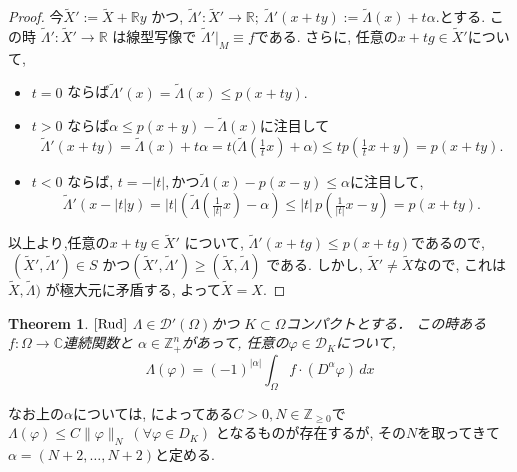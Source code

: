 \documentclass[dvipdfmx,a4paper,11pt]{article} %
\newtheorem{thm}{Theorem}[section]
\theoremstyle{definition}
\theoremstyle{remark}
\numberwithin{equation}{section}
\newcommand{\N}{\mathbb{Z}_+}
\newcommand{\C}{\mathbb{C}}
\begin{document}
\begin{proof}
今\(\widetilde{X}' := \widetilde{X} + \mathbb{R}y\) かつ, 
\(\widetilde{\Lambda}' : \widetilde{X}' \to \mathbb{R} ; \ \widetilde{\Lambda}'(x+ty) := \widetilde{\Lambda}(x) + t\alpha.\)とする. 
この時  \(\widetilde{\Lambda}' : \widetilde{X}' \to \mathbb{R}\) は線型写像で \(\widetilde{\Lambda}'|_M \equiv f\)である. 
さらに, 任意の\(x+tg \in \widetilde{X}'\)について, 
\begin{itemize}
\item \(t=0\) ならば\(\widetilde{\Lambda}'(x) = \widetilde{\Lambda}(x) \leq p(x+ty).\)
\item \(t>0\) ならば$\alpha \leq p(x+y)-\widetilde{\Lambda}(x)$に注目して
\[\widetilde{\Lambda}'(x+ty) = \widetilde{\Lambda}(x) + t\alpha = t\bigl(\widetilde{\Lambda}(\tfrac{1}{t}x) + \alpha \bigr) \leq t p(\tfrac{1}{t}x+y) = p(x+ty).
\]
\item \(t<0\) ならば,  \(t=-|t|,\)かつ\(\widetilde{\Lambda}(x)-p(x-y)\leq \alpha\)に注目して, 
\[
 \widetilde{\Lambda}'(x-|t|y) = |t|(\widetilde{\Lambda}(\tfrac{1}{|t|}x) - \alpha) \leq |t| \, p(\tfrac{1}{|t|}x-y) = p(x+ty).
\]
\end{itemize}
以上より,任意の$x+ty\in \widetilde{X}'$ について, 
\( \widetilde{\Lambda}'(x+tg) \leq p(x+tg) \)であるので, 
\(\ (\widetilde{X}',\widetilde{\Lambda}') \in S \) かつ\((\widetilde{X}',\widetilde{\Lambda}') \geq (\widetilde{X},\widetilde{\Lambda}) \)
である. 
しかし, \(\widetilde{X}' \neq \widetilde{X}\)なので, これは
\(\widetilde{X},\widetilde{\Lambda})\) が極大元に矛盾する, 
よって\( \widetilde{X}=X.\)
\end{proof}


\begin{tcolorbox}[mybox]
\begin{thm}{$\cite[Thm 6.26]{Rud}$}
\label{thm-H-2.4}
\(\Lambda \in \mathcal{D}'(\Omega)\)かつ \(K \subset \Omega\)コンパクトとする．
この時ある \(f : \Omega \to \C\)連続関数と \(\alpha \in \N^n\)があって, 
任意の\(\varphi \in \mathcal{D}_K\)について, 
\[
 \Lambda(\varphi) = (-1)^{|\alpha|} \int_{\Omega} f\cdot (D^{\alpha}\varphi)\, dx
\]
\end{thm}
\end{tcolorbox}
なお上の$\alpha$については, 
\cite[Thm6.8]{Rud}によってある\( C>0,  N \in \mathbb{Z}_{\geq 0}\)で
\(\Lambda(\varphi) \leq C \|\varphi\|_N \ (\forall \varphi \in D_K)\) 
となるものが存在するが, その$N$を取ってきて
\(\alpha = (N+2,\ldots,N+2)\)と定める.
\end{document}
